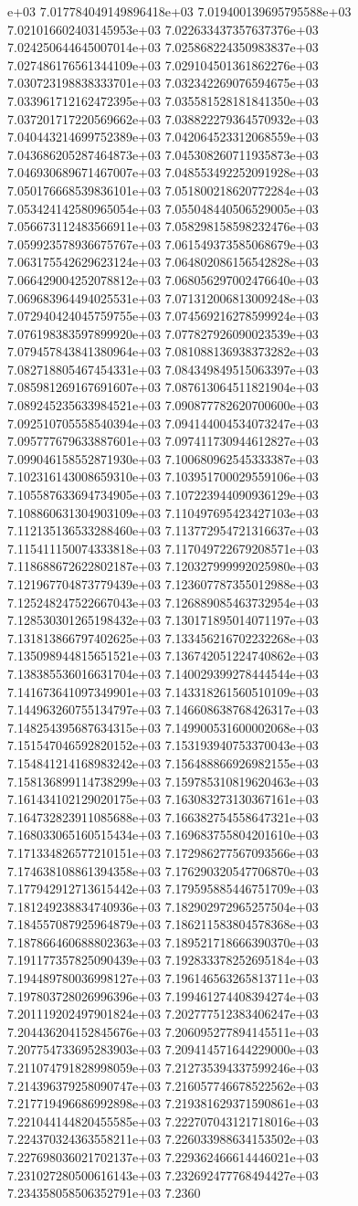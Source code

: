 e+03	7.017784049149896418e+03	7.019400139695795588e+03	7.021016602403145953e+03	7.022633437357637376e+03	7.024250644645007014e+03	7.025868224350983837e+03	7.027486176561344109e+03	7.029104501361862276e+03	7.030723198838333701e+03	7.032342269076594675e+03	7.033961712162472395e+03	7.035581528181841350e+03	7.037201717220569662e+03	7.038822279364570932e+03	7.040443214699752389e+03	7.042064523312068559e+03	7.043686205287464873e+03	7.045308260711935873e+03	7.046930689671467007e+03	7.048553492252091928e+03	7.050176668539836101e+03	7.051800218620772284e+03	7.053424142580965054e+03	7.055048440506529005e+03	7.056673112483566911e+03	7.058298158598232476e+03	7.059923578936675767e+03	7.061549373585068679e+03	7.063175542629623124e+03	7.064802086156542828e+03	7.066429004252078812e+03	7.068056297002476640e+03	7.069683964494025531e+03	7.071312006813009248e+03	7.072940424045759755e+03	7.074569216278599924e+03	7.076198383597899920e+03	7.077827926090023539e+03	7.079457843841380964e+03	7.081088136938373282e+03	7.082718805467454331e+03	7.084349849515063397e+03	7.085981269167691607e+03	7.087613064511821904e+03	7.089245235633984521e+03	7.090877782620700600e+03	7.092510705558540394e+03	7.094144004534073247e+03	7.095777679633887601e+03	7.097411730944612827e+03	7.099046158552871930e+03	7.100680962545333387e+03	7.102316143008659310e+03	7.103951700029559106e+03	7.105587633694734905e+03	7.107223944090936129e+03	7.108860631304903109e+03	7.110497695423427103e+03	7.112135136533288460e+03	7.113772954721316637e+03	7.115411150074333818e+03	7.117049722679208571e+03	7.118688672622802187e+03	7.120327999992025980e+03	7.121967704873779439e+03	7.123607787355012988e+03	7.125248247522667043e+03	7.126889085463732954e+03	7.128530301265198432e+03	7.130171895014071197e+03	7.131813866797402625e+03	7.133456216702232268e+03	7.135098944815651521e+03	7.136742051224740862e+03	7.138385536016631704e+03	7.140029399278444544e+03	7.141673641097349901e+03	7.143318261560510109e+03	7.144963260755134797e+03	7.146608638768426317e+03	7.148254395687634315e+03	7.149900531600002068e+03	7.151547046592820152e+03	7.153193940753370043e+03	7.154841214168983242e+03	7.156488866926982155e+03	7.158136899114738299e+03	7.159785310819620463e+03	7.161434102129020175e+03	7.163083273130367161e+03	7.164732823911085688e+03	7.166382754558647321e+03	7.168033065160515434e+03	7.169683755804201610e+03	7.171334826577210151e+03	7.172986277567093566e+03	7.174638108861394358e+03	7.176290320547706870e+03	7.177942912713615442e+03	7.179595885446751709e+03	7.181249238834740936e+03	7.182902972965257504e+03	7.184557087925964879e+03	7.186211583804578368e+03	7.187866460688802363e+03	7.189521718666390370e+03	7.191177357825090439e+03	7.192833378252695184e+03	7.194489780036998127e+03	7.196146563265813711e+03	7.197803728026996396e+03	7.199461274408394274e+03	7.201119202497901824e+03	7.202777512383406247e+03	7.204436204152845676e+03	7.206095277894145511e+03	7.207754733695283903e+03	7.209414571644229000e+03	7.211074791828998059e+03	7.212735394337599246e+03	7.214396379258090747e+03	7.216057746678522562e+03	7.217719496686992898e+03	7.219381629371590861e+03	7.221044144820455585e+03	7.222707043121718016e+03	7.224370324363558211e+03	7.226033988634153502e+03	7.227698036021702137e+03	7.229362466614446021e+03	7.231027280500616143e+03	7.232692477768494427e+03	7.234358058506352791e+03	7.2360